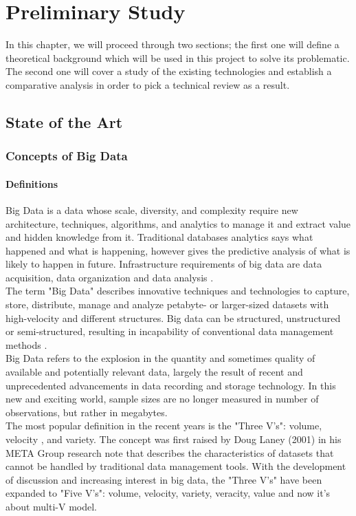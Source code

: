 \chapter{Preliminary Study} 
\label{Chapter2}
In this chapter, we will proceed through two sections; the first one will define a theoretical background which will be used in this project to solve its problematic. The second one will cover a study of the existing technologies and establish a comparative analysis in order to pick a technical review as a result.
\section{State of the Art}
\subsection{Concepts of Big Data}
\subsubsection{Definitions}
Big Data is a data whose scale, diversity, and complexity require new architecture, techniques, algorithms, and analytics to manage it and extract value and hidden knowledge from it. Traditional databases analytics says what happened and what is happening, however gives the predictive analysis of what is likely to happen in future. Infrastructure requirements of big data are data acquisition, data organization and data analysis \cite{cite16}. \\

The term "Big Data" describes innovative techniques and technologies to capture, store, distribute, manage and analyze
petabyte- or larger-sized datasets with high-velocity and different structures. Big data can be structured, unstructured or semi-structured, resulting in incapability of conventional data management methods \cite{cite17}.\\

Big Data refers to the explosion in the quantity and sometimes quality of available and potentially relevant data, largely the result of recent and unprecedented advancements in data recording and storage technology. In this new and exciting world, sample sizes are no longer measured in number of observations, but rather in megabytes.\\

The most popular definition in the recent years is the "Three V's": volume, velocity , and variety. The concept was first raised by Doug Laney (2001) in his META Group
research note \cite{cite} that describes the characteristics of datasets that cannot be handled by traditional data management tools. With the development of discussion and increasing interest in big data, the "Three V's" have been expanded to "Five V’s": volume, velocity, variety, veracity, value and now it's about multi-V model.
